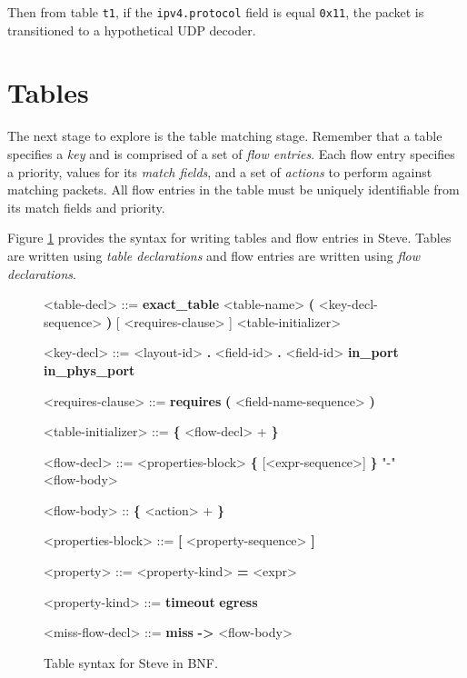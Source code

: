 Then from table \texttt{t1}, if the \texttt{ipv4.protocol} field is equal \texttt{0x11}, the packet is transitioned to a hypothetical UDP decoder.

\section{Tables} \label{table_tut}

The next stage to explore is the table matching stage. Remember that a table specifies a \textit{key} and is comprised of a set of \textit{flow entries}. Each flow entry specifies a priority, values for its \textit{match fields}, and a set of \textit{actions} to perform against matching packets. All flow entries in the table must be uniquely identifiable from its match fields and priority.

Figure \ref{fg:table_syntax} provides the syntax for writing tables and flow entries in Steve. Tables are written using \textit{table declarations} and flow entries are written using \textit{flow declarations}.

\begin{figure}[ht]
\begin{mdframed}
\begin{grammar}
<table-decl> ::=
\textbf{exact\_table} <table-name> \textbf{(} <key-decl-sequence> \textbf{)} 
[ <requires-clause> ] <table-initializer>

<key-decl> ::=
<layout-id> \textbf{.} <field-id>
 \textbf{.} <field-id>
\alt \textbf{in\_port}
\alt \textbf{in\_phys\_port}

<requires-clause> ::=
\textbf{requires} \textbf{(} <field-name-sequence> \textbf{)}

<table-initializer> ::= \textbf{\{} <flow-decl> + \textbf{\}}

<flow-decl> ::=
<properties-block>
\textbf{\{} [<expr-sequence>] \textbf{\}} "-\>" <flow-body>

<flow-body> :: \textbf{\{} <action> + \textbf{\}}

<properties-block> ::=
\textbf{[} <property-sequence> \textbf{]}

<property> ::=
<property-kind> \textbf{=} <expr>

<property-kind> ::=
\textbf{timeout}
\alt \textbf{egress}

<miss-flow-decl> ::=
\textbf{miss} \textbf{-\textgreater} <flow-body>
\end{grammar}
\end{mdframed}
\caption{Table syntax for Steve in BNF.}
\label{fg:table_syntax}
\end{figure}

